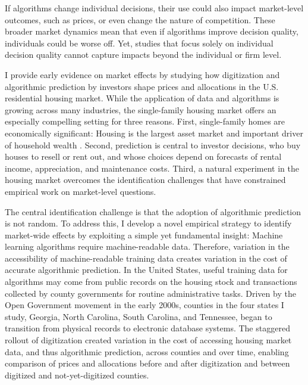 \documentclass[11pt]{article}
\begin{document}
If algorithms change individual decisions, their use could also impact market-level outcomes, such as prices, or even change the nature of competition. These broader market dynamics mean that even if algorithms improve decision quality, individuals could be worse off. Yet, studies that focus solely on individual decision quality cannot capture impacts beyond the individual or firm level. 


I provide early evidence on market effects by studying how digitization and algorithmic prediction by investors shape prices and allocations in the U.S. residential housing market. While the application of data and algorithms is growing across many industries, the single-family housing market offers an especially compelling setting for three reasons. First, single-family homes are economically significant: Housing is the largest asset market and important driver of household wealth \citep{corelogic2023, derenoncourtwealth2022}. Second, prediction is central to investor decisions, who buy houses to resell or rent out, and whose choices depend on forecasts of rental income, appreciation, and maintenance costs. Third, a natural experiment in the housing market overcomes the identification challenges that have constrained empirical work on market-level questions. 

The central identification challenge is that the adoption of algorithmic prediction is not random. To address this, I develop a novel empirical strategy to identify market-wide effects by exploiting a simple yet fundamental insight: Machine learning algorithms require machine-readable data. Therefore, variation in the accessibility of machine-readable training data creates variation in the cost of accurate algorithmic prediction. 
 In the United States, useful training data for algorithms may come from public records on the housing stock and transactions collected by county governments for routine administrative tasks. Driven by the Open Government movement in the early 2000s, counties in the four states I study, Georgia, North Carolina, South Carolina, and Tennessee, began to transition from physical records to electronic database systems. The staggered rollout of digitization created variation in the cost of accessing housing market data, and thus algorithmic prediction, across counties and over time, enabling comparison of prices and allocations before and after digitization and between digitized and not-yet-digitized counties. 
\end{document}
